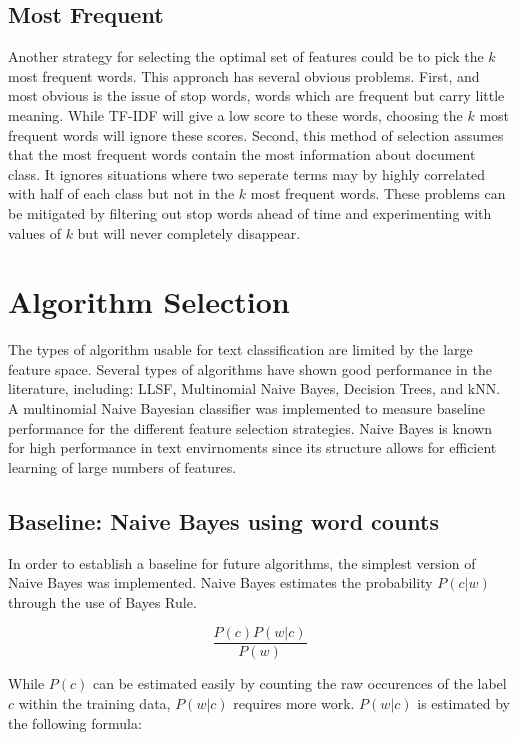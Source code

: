 \documentclass[10pt,twocolumn]{article}
\begin{document}
\subsection*{Most Frequent}

Another strategy for selecting the optimal set of features could be to pick the $k$ most frequent words. This approach has several obvious problems. First, and most obvious is the issue of stop words, words which are frequent but carry little meaning. While TF-IDF will give a low score to these words, choosing the $k$ most frequent words will ignore these scores. Second, this method of selection assumes that the most frequent words contain the most information about document class. It ignores situations where two seperate terms may by highly correlated with half of each class but not in the $k$ most frequent words. These problems can be mitigated by filtering out stop words ahead of time and experimenting with values of $k$ but will never completely disappear.

\section*{Algorithm Selection}

The types of algorithm usable for text classification are limited by the large feature space. Several types of algorithms have shown good performance in the literature, including: LLSF, Multinomial Naive Bayes, Decision Trees, and kNN. A multinomial Naive Bayesian classifier was implemented to measure baseline performance for the different feature selection strategies. Naive Bayes is known for high performance in text envirnoments since its structure allows for efficient learning of large numbers of features.

\subsection*{Baseline: Naive Bayes using word counts}

In order to establish a baseline for future algorithms, the simplest version of Naive Bayes was implemented. Naive Bayes estimates the probability $P(c|w)$ through the use of Bayes Rule.

\[ \frac {P(c)P(w|c)} {P(w)} \]

While $P(c)$ can be estimated easily by counting the raw occurences of the label $c$ within the training data, $P(w|c)$ requires more work. $P(w|c)$ is estimated by the following formula:
\end{document}
